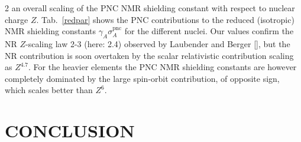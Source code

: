 \documentclass[a4paper,12pt,english]{article}
\begin{document}
\begin{spacing}{2}
an overall scaling of the PNC NMR shielding constant with respect to nuclear charge $Z$. \mbox{Tab. \ref{redpar}} shows the 
PNC contributions to the reduced (isotropic) NMR shielding constants 
$\gamma_A\sigma_A^\text{pnc}$ for the different nuclei. Our values confirm the NR $Z$-scaling law 2-3 
(here: 2.4) observed by Laubender and Berger [\cite{berger2003chemphyschem}], but the NR
contribution is soon overtaken by the scalar relativistic contribution scaling as $Z^{4.7}$. For the heavier
elements the PNC NMR shielding constants are however completely dominated by the large 
spin-orbit contribution, of opposite sign, which scales better than $Z^6$.


\section{CONCLUSION}


\end{spacing}
\end{document}
